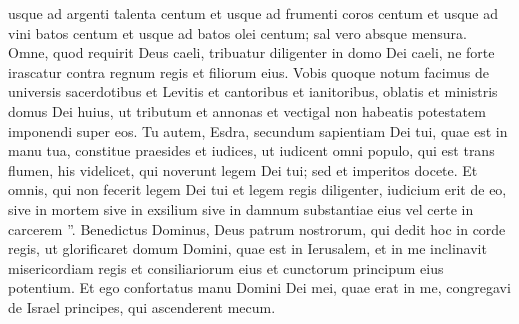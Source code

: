 \begin{biblechapter}
\begin{biblechapter}
\begin{biblechapter}
\begin{biblechapter}
\begin{biblechapter}
\begin{biblechapter}
\begin{biblechapter}
\verse usque ad argenti talenta centum et usque ad frumenti coros centum et usque ad vini batos centum et usque ad batos olei centum; sal vero absque mensura. 
\verse Omne, quod requirit Deus caeli, tribuatur diligenter in domo Dei caeli, ne forte irascatur contra regnum regis et filiorum eius. 
\verse Vobis quoque notum facimus de universis sacerdotibus et Levitis et cantoribus et ianitoribus, oblatis et ministris domus Dei huius, ut tributum et annonas et vectigal non habeatis potestatem imponendi super eos.
 \verse Tu autem, Esdra, secundum sapientiam Dei tui, quae est in manu tua, constitue praesides et iudices, ut iudicent omni populo, qui est trans flumen, his videlicet, qui noverunt legem Dei tui; sed et imperitos docete. 
\verse Et omnis, qui non fecerit legem Dei tui et legem regis diligenter, iudicium erit de eo, sive in mortem sive in exsilium sive in damnum substantiae eius vel certe in carcerem ”.
 \verse Benedictus Dominus, Deus patrum nostrorum, qui dedit hoc in corde regis, ut glorificaret domum Domini, quae est in Ierusalem, 
\verse et in me inclinavit misericordiam regis et consiliariorum eius et cunctorum principum eius potentium. Et ego confortatus manu Domini Dei mei, quae erat in me, congregavi de Israel principes, qui ascenderent mecum.
 

\end{biblechapter}
\end{biblechapter}
\end{biblechapter}
\end{biblechapter}
\end{biblechapter}
\end{biblechapter}
\end{biblechapter}
